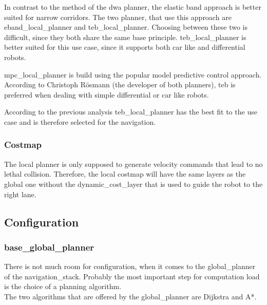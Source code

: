 In contrast to the method of the dwa planner, the elastic band approach is better suited for narrow corridors. The two planner, that use this approach are eband\_local\_planner and teb\_local\_planner. Choosing between these two is difficult, since they both share the same base principle. teb\_local\_planner is better suited for this use case, since it supports both car like and differential robots.

mpc\_local\_planner is build using the popular model predictive control approach. According to Christoph Rösmann (the developer of both planners), teb is preferred when dealing with simple differential or car like robots\cite{mpcvsteb}. 

According to the previous analysis teb\_local\_planner has the best fit to the use case and is therefore selected for the navigation.


\subsubsection{Costmap}
The local planner is only supposed to generate velocity commands that lead to no lethal collision. Therefore, the local costmap will have the same layers as the global one without the dynamic\_cost\_layer that is used to guide the robot to the right lane.

\subsection{Configuration}
\subsubsection{base\_global\_planner}
\label{globalplannertest}
There is not much room for configuration, when it comes to the global\_planner of the navigation\_stack. Probably the most important step for computation load is the choice of a planning algorithm.\\
The two algorithms that are offered by the global\_planner are Dijkstra and A*.\\

